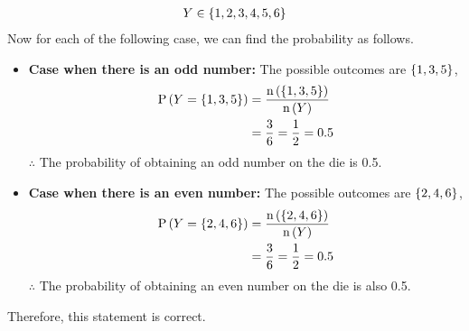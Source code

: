 \documentclass[journal,12pt,twocolumn]{IEEEtran}
\begin{document}
\begin{enumerate}[label=(\roman*)]
\begin{align*}
    Y \in \left\{1,2,3,4,5,6\right\}
    \end{align*}
    Now for each of the following case, we can find the probability as follows.      
    \begin{itemize}
    \item \textbf{Case when there is an odd number:} The possible outcomes are $\left\{1,3,5\right\}$,
    \begin{align}
    \text{P}\left(Y = \left\{1,3,5\right\}\right) &= \frac{\text{n}\left(\left\{1,3,5\right\}\right)}{\text{n}\left(Y\right)}\\
                                              &= \frac{3}{6} = \frac{1}{2} = 0.5
    \end{align}
    $\therefore$ The probability of obtaining an odd number on the die is 0.5.
    \item \textbf{Case when there is an even number:} The possible outcomes are $\left\{2,4,6\right\}$,
    \begin{align}
    \text{P}\left(Y = \left\{2,4,6\right\}\right) &= \frac{\text{n}\left(\left\{2,4,6\right\}\right)}{\text{n}\left(Y\right)}\\
                                              &= \frac{3}{6} = \frac{1}{2} = 0.5
    \end{align}
    $\therefore$ The probability of obtaining an even number on the die is also 0.5.
    \end{itemize}
    Therefore, this statement is correct.
	\end{enumerate}
\end{document}
